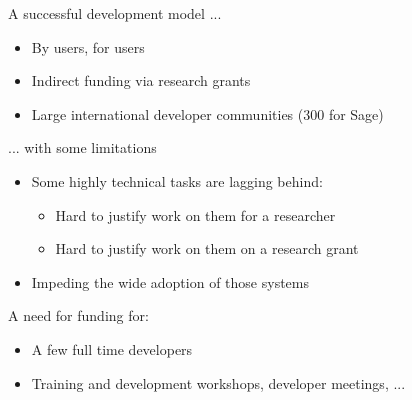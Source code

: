 \documentclass[
  usenames,svgnames, %
  compress,
  ]{beamer}
\begin{document}
\begin{frame}
  \begin{block}{A successful development model ...}
    \begin{itemize}
    \item By users, for users
    \item Indirect funding via research grants
    \item Large international developer communities (300 for Sage)
    \end{itemize}
  \end{block}
  \pause

  \begin{block}{... with some limitations}
    \begin{itemize}
    \item Some highly technical tasks are lagging behind:
      \begin{itemize}
      \item Hard to justify work on them for a researcher
      \item Hard to justify work on them on a research grant
      \end{itemize}
    \item Impeding the wide adoption of those systems
    \end{itemize}
  \end{block}
  \pause

  \begin{block}{A need for funding for:}
    \begin{itemize}
    \item A few full time developers
    \item Training and development workshops, developer meetings, ...
    \end{itemize}
  \end{block}
\end{frame}
\end{document}

